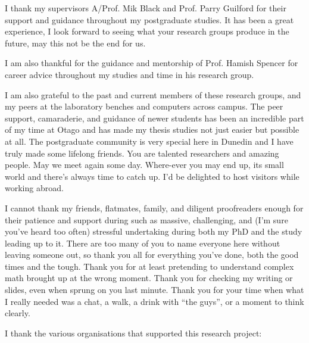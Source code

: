 I thank my supervisors A/Prof. Mik Black and Prof. Parry Guilford for their support and guidance throughout my postgraduate studies. It has been a great experience, I look forward to seeing what your research groups produce in the future, may this not be the end for us.

I am also thankful for the guidance and mentorship of Prof. Hamish Spencer for career advice throughout my studies and time in his research group.

I am also grateful to the past and current members of these research groups, and my peers at the laboratory benches and computers across campus. The peer support, camaraderie, and guidance of newer students has been an incredible part of my time at Otago and has made my thesis studies not just easier but possible at all. The postgraduate community is very special here in Dunedin and I have truly made some lifelong friends. You are talented researchers and amazing people. May we meet again some day. Where-ever you may end up, its small world and there's always time to catch up. I'd be delighted to host visitors while working abroad.

I cannot thank my friends, flatmates, family, and diligent proofreaders enough for their patience and support during such as massive, challenging, and (I'm sure you've heard too often) stressful undertaking during both my PhD and the study leading up to it. There are too many of you to name everyone here without leaving someone out, so thank you all for everything you've done, both the good times and the tough. Thank you for at least pretending to understand complex math brought up at the wrong moment. Thank you for checking my writing or slides, even when sprung on you last minute. Thank you for your time when what I really needed was a chat, a walk, a drink with ``the guys'', or a moment to think clearly.

I thank the various organisations that supported this research project:

